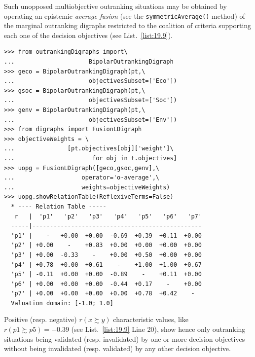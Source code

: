 Such unopposed multiobjective outranking situations may be obtained by operating an epistemic \emph{average fusion} (see the \texttt{symmetricAverage()} method) of the marginal outranking digraphs restricted to the coalition of criteria supporting each one of the decision objectives (see List.~\vref{list:19.9}).
\begin{lstlisting}[caption={Computing unopposed outranking situations},label=list:19.9]
>>> from outrankingDigraphs import\
...                     BipolarOutrankingDigraph
>>> geco = BipolarOutrankingDigraph(pt,\
...                     objectivesSubset=['Eco'])
>>> gsoc = BipolarOutrankingDigraph(pt,\
...                     objectivesSubset=['Soc'])
>>> genv = BipolarOutrankingDigraph(pt,\
...                     objectivesSubset=['Env'])
>>> from digraphs import FusionLDigraph
>>> objectiveWeights = \
...               [pt.objectives[obj]['weight']\
...                      for obj in t.objectives] 
>>> uopg = FusionLDigraph([geco,gsoc,genv],\
...                   operator='o-average',\
...                   weights=objectiveWeights)
>>> uopg.showRelationTable(ReflexiveTerms=False)
  * ---- Relation Table -----
   r   |  'p1'   'p2'   'p3'   'p4'   'p5'   'p6'   'p7'   
  -----|------------------------------------------------
  'p1' |    -   +0.00  +0.00  -0.69  +0.39  +0.11  +0.00  
  'p2' | +0.00    -    +0.83  +0.00  +0.00  +0.00  +0.00  
  'p3' | +0.00  -0.33    -    +0.00  +0.50  +0.00  +0.00  
  'p4' | +0.78  +0.00  +0.61    -    +1.00  +1.00  +0.67  
  'p5' | -0.11  +0.00  +0.00  -0.89    -    +0.11  +0.00  
  'p6' | +0.00  +0.00  +0.00  -0.44  +0.17    -    +0.00  
  'p7' | +0.00  +0.00  +0.00  +0.00  +0.78  +0.42    -   
  Valuation domain: [-1.0; 1.0]
\end{lstlisting}

Positive (resp. negative) $r(x \succsim y)$ characteristic values, like $r(p1 \succsim p5) = +0.39$ (see List.~\vref{list:19.9} Line 20), show hence only outranking situations being validated (resp. invalidated) by one or more decision objectives without being invalidated (resp. validated) by any other decision objective.

